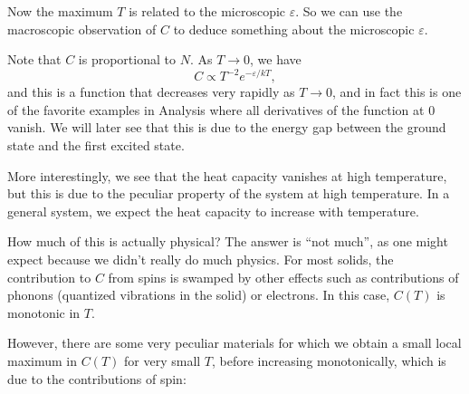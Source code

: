 \documentclass[a4paper]{article}
\begin{document}
\begin{eg}
\begin{center}
  \end{center}
  Now the maximum $T$ is related to the microscopic $\varepsilon$. So we can use the macroscopic observation of $C$ to deduce something about the microscopic $\varepsilon$.

  Note that $C$ is proportional to $N$. As $T \to 0$, we have
  \[
    C \propto T^{-2} e^{-\varepsilon/kT},
  \]
  and this is a function that decreases very rapidly as $T \to 0$, and in fact this is one of the favorite examples in Analysis where all derivatives of the function at $0$ vanish. We will later see that this is due to the energy gap between the ground state and the first excited state.

  More interestingly, we see that the heat capacity vanishes at high temperature, but this is due to the peculiar property of the system at high temperature. In a general system, we expect the heat capacity to increase with temperature.

  How much of this is actually physical? The answer is ``not much'', as one might expect because we didn't really do much physics. For most solids, the contribution to $C$ from spins is swamped by other effects such as contributions of phonons (quantized vibrations in the solid) or electrons. In this case, $C(T)$ is monotonic in $T$.

  However, there are some very peculiar materials for which we obtain a small local maximum in $C(T)$ for very small $T$, before increasing monotonically, which is due to the contributions of spin:
  \begin{center}
\end{center}
\end{eg}
\end{document}
